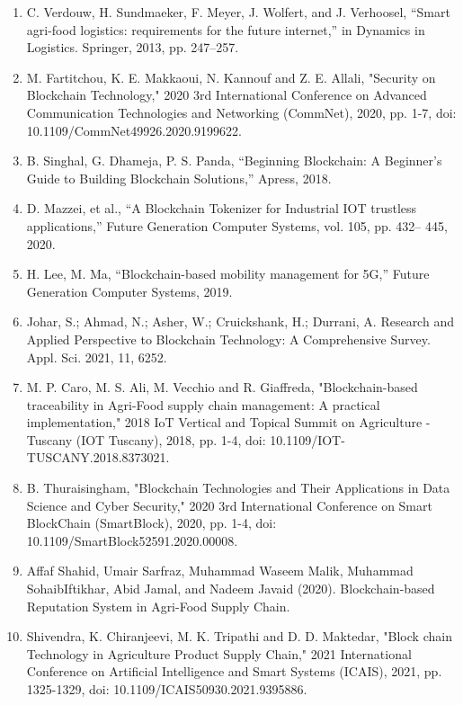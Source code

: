 \documentclass[12pt,a4paper,twocolumn,fleqn]{article}
\begin{document}
\begin{enumerate}
    \item C. Verdouw, H. Sundmaeker, F. Meyer, J. Wolfert, and J. Verhoosel, “Smart agri-food logistics: requirements for the future internet,” in Dynamics in Logistics. Springer, 2013, pp. 247–257.
    \item M. Fartitchou, K. E. Makkaoui, N. Kannouf and Z. E. Allali, "Security on Blockchain Technology," 2020 3rd International Conference on Advanced Communication Technologies and Networking (CommNet), 2020, pp. 1-7, doi: 10.1109/CommNet49926.2020.9199622.
    \item B. Singhal, G. Dhameja, P. S. Panda, “Beginning Blockchain: A Beginner’s Guide to Building Blockchain Solutions,” Apress, 2018.
    \item D. Mazzei, et al., “A Blockchain Tokenizer for Industrial IOT trustless applications,” Future Generation Computer Systems, vol. 105, pp. 432– 445, 2020.
    \item H. Lee, M. Ma, “Blockchain-based mobility management for 5G,” Future Generation Computer Systems, 2019.
    \item Johar, S.; Ahmad, N.; Asher, W.; Cruickshank, H.; Durrani, A. Research and Applied Perspective to Blockchain Technology: A Comprehensive Survey. Appl. Sci. 2021, 11, 6252. 
    \item M. P. Caro, M. S. Ali, M. Vecchio and R. Giaffreda, "Blockchain-based traceability in Agri-Food supply chain management: A practical implementation," 2018 IoT Vertical and Topical Summit on Agriculture - Tuscany (IOT Tuscany), 2018, pp. 1-4, doi: 10.1109/IOT-TUSCANY.2018.8373021.
    \item B. Thuraisingham, "Blockchain Technologies and Their Applications in Data Science and Cyber Security," 2020 3rd International Conference on Smart BlockChain (SmartBlock), 2020, pp. 1-4, doi: 10.1109/SmartBlock52591.2020.00008.
    \item  Affaf Shahid, Umair Sarfraz, Muhammad Waseem Malik, Muhammad SohaibIftikhar, Abid Jamal, and Nadeem Javaid (2020). Blockchain-based Reputation System in Agri-Food Supply Chain. 
    \item Shivendra, K. Chiranjeevi, M. K. Tripathi and D. D. Maktedar, "Block chain Technology in Agriculture Product Supply Chain," 2021 International Conference on Artificial Intelligence and Smart Systems (ICAIS), 2021, pp. 1325-1329, doi: 10.1109/ICAIS50930.2021.9395886.
\end{enumerate}
\newpage
  \pagestyle{fancy}
  \fancyhf{}
  \chead{}
\renewcommand{\footrulewidth}{0.4pt}%
\normalsize
\end{document}
